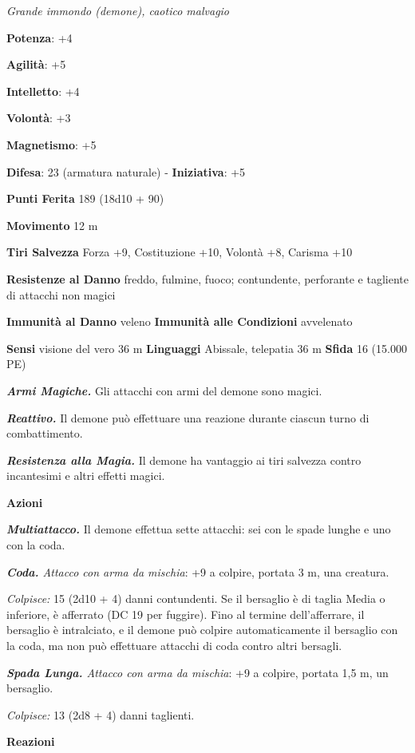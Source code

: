 \begin{multicols}{2}
\emph{Grande immondo (demone), caotico malvagio}

\textbf{Potenza}: +4

\textbf{Agilità}: +5

\textbf{Intelletto}: +4

\textbf{Volontà}: +3

\textbf{Magnetismo}: +5

\textbf{Difesa}: 23 (armatura naturale) - \textbf{Iniziativa}: +5

\textbf{Punti Ferita} 189 (18d10 + 90)

\textbf{Movimento} 12 m

\textbf{Tiri Salvezza} Forza +9, Costituzione +10, Volontà +8, Carisma
+10

\textbf{Resistenze al Danno} freddo, fulmine, fuoco; contundente,
perforante e tagliente di attacchi non magici

\textbf{Immunità al Danno} veleno \textbf{Immunità alle Condizioni}
avvelenato

\textbf{Sensi} visione del vero 36 m
\textbf{Linguaggi} Abissale, telepatia 36 m \textbf{Sfida} 16 (15.000
PE)

\emph{\textbf{Armi Magiche.}} Gli attacchi con armi del demone sono
magici.

\emph{\textbf{Reattivo.}} Il demone può effettuare una reazione durante
ciascun turno di combattimento.

\emph{\textbf{Resistenza alla Magia.}} Il demone ha vantaggio ai tiri
salvezza contro incantesimi e altri effetti magici.

\textbf{Azioni}

\emph{\textbf{Multiattacco.}} Il demone effettua sette attacchi: sei con
le spade lunghe e uno con la coda.

\emph{\textbf{Coda.} Attacco con arma da mischia}: +9 a colpire, portata
3 m, una creatura.

\emph{Colpisce:} 15 (2d10 + 4) danni contundenti. Se il bersaglio è di
taglia Media o inferiore, è afferrato (DC 19 per fuggire). Fino al
termine dell'afferrare, il bersaglio è intralciato, e il demone può
colpire automaticamente il bersaglio con la coda, ma non può effettuare
attacchi di coda contro altri bersagli.

\emph{\textbf{Spada Lunga.} Attacco con arma da mischia}: +9 a colpire,
portata 1,5 m, un bersaglio.

\emph{Colpisce:} 13 (2d8 + 4) danni taglienti.

\textbf{Reazioni}


\end{multicols}
